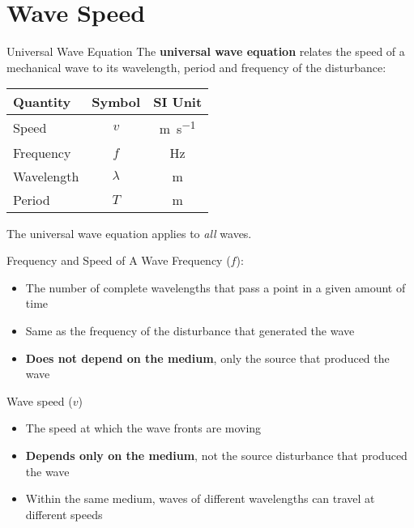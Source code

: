 \documentclass[12pt,aspectratio=169]{beamer}
\newcommand{\eq}[2]{\vspace{#1}{\Large\begin{displaymath}#2\end{displaymath}}}
\begin{document}
\section{Wave Speed}

\begin{frame}{Universal Wave Equation}
  The \textbf{universal wave equation} relates the speed of a mechanical wave
  to its wavelength, period and frequency of the disturbance:

  \eq{-.15in}{
    \boxed{v = f\lambda =\frac{\lambda}{T}}
  }
  \begin{center}
    \begin{tabular}{l|c|c}
      \rowcolor{pink}
      \textbf{Quantity} & \textbf{Symbol} & \textbf{SI Unit} \\ \hline
      Speed         & $v$       & \si{\metre\per\second} \\
      Frequency     & $f$       & \si{\hertz} \\
      Wavelength    & $\lambda$ & \si{\metre} \\
      Period        & $T$       & \si{\metre} 
    \end{tabular}
  \end{center}
  The universal wave equation applies to \emph{all} waves. %
\end{frame}



\begin{frame}{Frequency and Speed of A Wave}
  Frequency ($f$):
  \begin{itemize}
  \item The number of complete wavelengths that pass a point in a given amount
    of time
  \item Same as the frequency of the disturbance that generated the wave
  \item\textbf{Does not depend on the medium}, only the source that produced
    the wave
  \end{itemize}

  \vspace{.2in}Wave speed ($v$)
  \begin{itemize}
  \item The speed at which the wave fronts are moving
  \item \textbf{Depends only on the medium}, not the source disturbance that
    produced the wave
  \item Within the same medium, waves of different wavelengths can travel
    at different speeds
  \end{itemize}
\end{frame}
\end{document}
